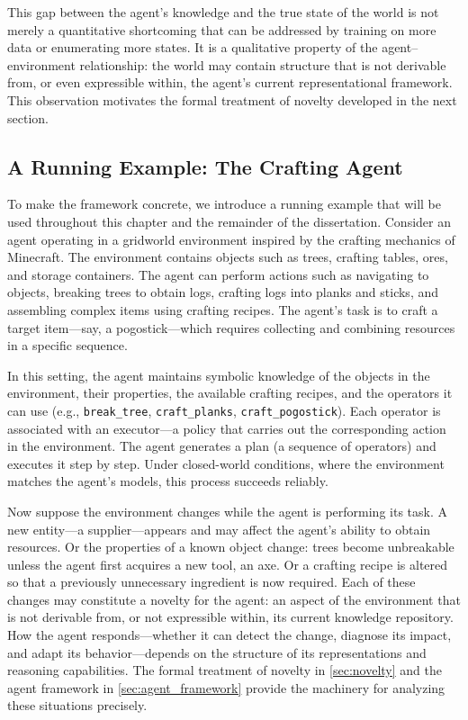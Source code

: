 This gap between the agent's knowledge and the true state of the world is not merely a quantitative shortcoming that can be addressed by training on more data or enumerating more states. It is a qualitative property of the agent--environment relationship: the world may contain structure that is not derivable from, or even expressible within, the agent's current representational framework. This observation motivates the formal treatment of novelty developed in the next section.

\subsection{A Running Example: The Crafting Agent}
\label{sec:running_example}

To make the framework concrete, we introduce a running example that will be used throughout this chapter and the remainder of the dissertation. Consider an agent operating in a gridworld environment inspired by the crafting mechanics of Minecraft. The environment contains objects such as trees, crafting tables, ores, and storage containers. The agent can perform actions such as navigating to objects, breaking trees to obtain logs, crafting logs into planks and sticks, and assembling complex items using crafting recipes. The agent's task is to craft a target item---say, a pogostick---which requires collecting and combining resources in a specific sequence.

In this setting, the agent maintains symbolic knowledge of the objects in the environment, their properties, the available crafting recipes, and the operators it can use (e.g., \texttt{break\_tree}, \texttt{craft\_planks}, \texttt{craft\_pogostick}). Each operator is associated with an executor---a policy that carries out the corresponding action in the environment. The agent generates a plan (a sequence of operators) and executes it step by step. Under closed-world conditions, where the environment matches the agent's models, this process succeeds reliably.

Now suppose the environment changes while the agent is performing its task. A new entity---a supplier---appears and may affect the agent's ability to obtain resources. Or the properties of a known object change: trees become unbreakable unless the agent first acquires a new tool, an axe. Or a crafting recipe is altered so that a previously unnecessary ingredient is now required. Each of these changes may constitute a novelty for the agent: an aspect of the environment that is not derivable from, or not expressible within, its current knowledge repository. How the agent responds---whether it can detect the change, diagnose its impact, and adapt its behavior---depends on the structure of its representations and reasoning capabilities. The formal treatment of novelty in \cref{sec:novelty} and the agent framework in \cref{sec:agent_framework} provide the machinery for analyzing these situations precisely.

